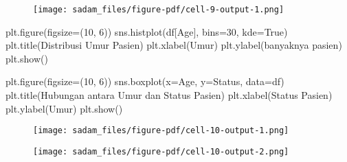 \documentclass[
  letterpaper,
]{krantz}
\makeatletter
\newenvironment{Shaded}{\begin{snugshade}}{\end{snugshade}}
\newcommand{\DecValTok}[1]{\textcolor[rgb]{0.68,0.00,0.00}{#1}}
\newcommand{\NormalTok}[1]{\textcolor[rgb]{0.00,0.23,0.31}{#1}}
\newcommand{\OperatorTok}[1]{\textcolor[rgb]{0.37,0.37,0.37}{#1}}
\newcommand{\StringTok}[1]{\textcolor[rgb]{0.13,0.47,0.30}{#1}}
\newcommand{\VariableTok}[1]{\textcolor[rgb]{0.07,0.07,0.07}{#1}}
\newenvironment{kframe}{%
\medskip{}
\setlength{\fboxsep}{.8em}
 \def\at@end@of@kframe{}%
 \ifinner\ifhmode%
  \def\at@end@of@kframe{\end{minipage}}%
  \begin{minipage}{\columnwidth}%
 \fi\fi%
 \def\FrameCommand##1{\hskip\@totalleftmargin \hskip-\fboxsep
 \colorbox{shadecolor}{##1}\hskip-\fboxsep
     \hskip-\linewidth \hskip-\@totalleftmargin \hskip\columnwidth}%
 \MakeFramed {\advance\hsize-\width
   \@totalleftmargin\z@ \linewidth\hsize
   \@setminipage}}%
 {\par\unskip\endMakeFramed%
 \at@end@of@kframe}
\renewenvironment{Shaded}{\begin{kframe}}{\end{kframe}}
\makeatother
\begin{document}
\begin{figure}[H]

{\centering \texttt{[image: sadam\_files/figure-pdf/cell-9-output-1.png]}

}

\end{figure}

\begin{Shaded}
\begin{Highlighting}[]

\NormalTok{plt.figure(figsize}\OperatorTok{=}\NormalTok{(}\DecValTok{10}\NormalTok{, }\DecValTok{6}\NormalTok{))}
\NormalTok{sns.histplot(df[}\StringTok{\textquotesingle{}Age\textquotesingle{}}\NormalTok{], bins}\OperatorTok{=}\DecValTok{30}\NormalTok{, kde}\OperatorTok{=}\VariableTok{True}\NormalTok{)}
\NormalTok{plt.title(}\StringTok{\textquotesingle{}Distribusi Umur Pasien\textquotesingle{}}\NormalTok{)}
\NormalTok{plt.xlabel(}\StringTok{\textquotesingle{}Umur\textquotesingle{}}\NormalTok{)}
\NormalTok{plt.ylabel(}\StringTok{\textquotesingle{}banyaknya pasien\textquotesingle{}}\NormalTok{)}
\NormalTok{plt.show()}

\NormalTok{plt.figure(figsize}\OperatorTok{=}\NormalTok{(}\DecValTok{10}\NormalTok{, }\DecValTok{6}\NormalTok{))}
\NormalTok{sns.boxplot(x}\OperatorTok{=}\StringTok{\textquotesingle{}Age\textquotesingle{}}\NormalTok{, y}\OperatorTok{=}\StringTok{\textquotesingle{}Status\textquotesingle{}}\NormalTok{, data}\OperatorTok{=}\NormalTok{df)}
\NormalTok{plt.title(}\StringTok{\textquotesingle{}Hubungan antara Umur dan Status Pasien\textquotesingle{}}\NormalTok{)}
\NormalTok{plt.xlabel(}\StringTok{\textquotesingle{}Status Pasien\textquotesingle{}}\NormalTok{)}
\NormalTok{plt.ylabel(}\StringTok{\textquotesingle{}Umur\textquotesingle{}}\NormalTok{)}
\NormalTok{plt.show()}
\end{Highlighting}
\end{Shaded}

\begin{figure}[H]

{\centering \texttt{[image: sadam\_files/figure-pdf/cell-10-output-1.png]}

}

\end{figure}

\begin{figure}[H]

{\centering \texttt{[image: sadam\_files/figure-pdf/cell-10-output-2.png]}

}

\end{figure}
\end{document}
